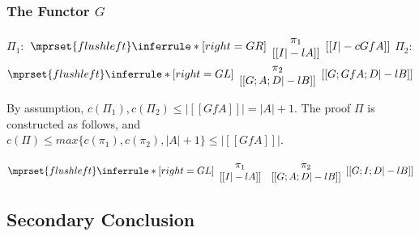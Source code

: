 \subsubsection{The Functor $G$}
\begin{center}
  \scriptsize
  $\Pi_1:$
  \begin{math}
    $$\mprset{flushleft}
    \inferrule* [right={\tiny GR}] {
      {
        \begin{array}{c}
          \pi_1 \\
          {[[I |-l A]]}
        \end{array}
      }
    }{[[I |-c Gf A]]}
  \end{math}
  \qquad\qquad
  $\Pi_2:$
  \begin{math}
    $$\mprset{flushleft}
    \inferrule* [right={\tiny GL}] {
      {
        \begin{array}{c}
          \pi_2 \\
          {[[G; A; D |-l B]]}
        \end{array}
      }
    }{[[G; Gf A; D |-l B]]}
  \end{math}
\end{center}
By assumption, $c(\Pi_1),c(\Pi_2)\leq |[[Gf A]]| = |A|+1$. The proof $\Pi$ 
is constructed as follows, and \\
$c(\Pi)\leq max\{c(\pi_1),c(\pi_2),|A|+1\}\leq |[[Gf A]]|$.
\begin{center}
  \scriptsize
  \begin{math}
    $$\mprset{flushleft}
    \inferrule* [right={\tiny GL}] {
      {
        \begin{array}{cc}
          \pi_1 & \pi_2 \\
          {[[I |-l A]]} & {[[G; A; D |-l B]]}
        \end{array}
      }
    }{[[G; I; D |-l B]]}
  \end{math}
\end{center}



\subsection{Secondary Conclusion}

